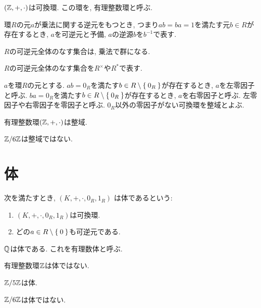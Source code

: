 \begin{example}
  $(\mathbb{Z},+,\cdot)$は可換環.
  この環を, 有理整数環と呼ぶ.
\end{example}

\begin{definition}
  環$R$の元$a$が乗法に関する逆元をもつとき,
  つまり$ab=ba=1$を満たす元$b\in R$が存在するとき,
  $a$を可逆元と予備,
  $a$の逆源$b$を$b^{-1}$で表す.
\end{definition}
\begin{proposition}
  $R$の可逆元全体のなす集合は, 乗法で群になる.
\end{proposition}

\begin{definition}
  $R$の可逆元全体のなす集合を$R^\times$や$R^\ast$で表す.
\end{definition}

\begin{definition}
  $a$を環$R$の元とする.
  $ab=0_R$を満たす$b\in R\setminus\Set{0_R}$が存在するとき,
  $a$を左零因子と呼ぶ.
  $ba=0_R$を満たす$b\in R\setminus\Set{0_R}$が存在するとき,
  $a$を右零因子と呼ぶ.
  左零因子や右零因子を零因子と呼ぶ.
  $0_R$以外の零因子がない可換環を整域とよぶ.
\end{definition}
  

\begin{example}
  有理整数環$(\mathbb{Z},+,\cdot)$は整域.
\end{example}

\begin{nonexample}
  $\mathbb{Z}/6\mathbb{Z}$は整域ではない.
\end{nonexample}

\section{体}
\begin{definition}
  次を満たすとき,
  $(K,+,\cdot,0_R, 1_R)$
  は体であるという:
  \begin{enumerate}
  \item $(K,+,\cdot,0_R, 1_R)$は可換環.
  \item どの$a\in R\setminus\Set{0}$も可逆元である.
  \end{enumerate}
\end{definition}
\begin{example}
  $\mathbb{Q}$は体である.
  これを有理数体と呼ぶ.
\end{example}
\begin{nonexample}
  有理整数環$\mathbb{Z}$は体ではない.
\end{nonexample}
\begin{example}
  $\mathbb{Z}/5\mathbb{Z}$は体.
\end{example}
\begin{nonexample}
  $\mathbb{Z}/6\mathbb{Z}$は体ではない.
\end{nonexample}

